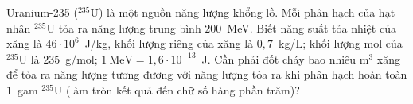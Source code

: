 	\begin{ex}%
		Uranium-235 ($^{235}\text{U}$) là một nguồn năng lượng khổng lồ. Mỗi phân hạch của hạt nhân $^{235}\text{U}$ tỏa ra năng lượng trung bình $200$~MeV. Biết năng suất tỏa nhiệt của xăng là $46\cdot 10^6$~J/kg, khối lượng riêng của xăng là $0{,}7$~kg/L; khối lượng mol của $^{235}\text{U}$ là $235$~g/mol; $1~\text{MeV}=1{,}6\cdot 10^{-13}$~J. Cần phải đốt cháy bao nhiêu $\text{m}^3$ xăng để tỏa ra năng lượng tương đương với năng lượng tỏa ra khi phân hạch hoàn toàn $1$~gam $^{235}\text{U}$ (làm tròn kết quả đến chữ số hàng phần trăm)?
		\par
	\end{ex}

